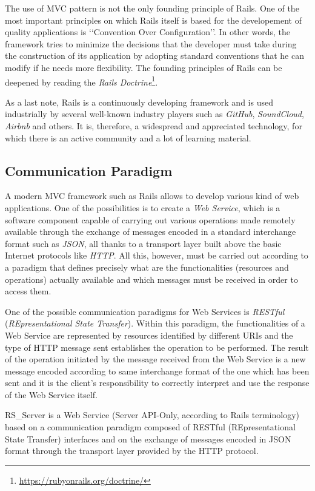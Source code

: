 \documentclass[a4paper, english]{article}
\begin{document}
The use of MVC pattern is not the only founding principle of Rails. One of the most important principles on which Rails itself is based for the developement of quality applications is \lq\lq Convention Over Configuration\rq\rq{}. In other words, the framework tries to minimize the decisions that the developer must take during the construction of its application by adopting standard conventions that he can modify if he needs more flexibility. The founding principles of Rails can be deepened by reading the \emph{Rails Doctrine}\footnote{\url{https://rubyonrails.org/doctrine/}}.

As a last note, Rails is a continuously developing framework and is used industrially by several well-known industry players such as \emph{GitHub}, \emph{SoundCloud}, \emph{Airbnb} and others. It is, therefore, a widespread and appreciated technology, for which there is an active community and a lot of learning material.

\subsection{Communication Paradigm}

A modern MVC framework such as Rails allows to develop various kind of web applications. One of the possibilities is to create a \emph{Web Service}, which is a software component capable of carrying out various operations made remotely available through the exchange of messages encoded in a standard interchange format such as \emph{JSON}, all thanks to a transport layer built above the basic Internet protocols like \emph{HTTP}. All this, however, must be carried out according to a paradigm that defines precisely what are the functionalities (resources and operations) actually available and which messages must be received in order to access them.

One of the possible communication paradigms for Web Services is \emph{RESTful} (\emph{REpresentational State Transfer}). Within this paradigm, the functionalities of a Web Service are represented by resources identified by different URIs and the type of HTTP message sent establishes the operation to be performed. The result of the operation initiated by the message received from the Web Service is a new message encoded according to same interchange format of the one which has been sent and it is the client's responsibility to correctly interpret and use the response of the Web Service itself.

RS\_Server is a Web Service (Server API-Only, according to Rails terminology) based on a communication paradigm composed of RESTful (REpresentational State Transfer) interfaces and on the exchange of messages encoded in JSON format through the transport layer provided by the HTTP protocol.
\end{document}
